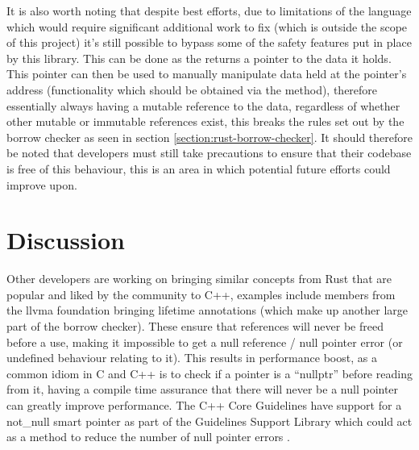 \documentclass[a4paper]{article}
\begin{document}
It is also worth noting that despite best efforts, due to limitations of the language which would require significant additional work to fix (which is outside the scope of this project) it's still possible to bypass some of the safety features put in place by this library. This can be done as the  returns a pointer to the data it holds. This pointer can then be used to manually manipulate data held at the pointer's address (functionality which should be obtained via the  method), therefore essentially always having a mutable reference to the data, regardless of whether other mutable or immutable references exist, this breaks the rules set out by the borrow checker as seen in section \ref{section:rust-borrow-checker}. It should therefore be noted that developers must still take precautions to ensure that their codebase is free of this behaviour, this is an area in which potential future efforts could improve upon.

\section{Discussion}
Other developers are working on bringing similar concepts from Rust that are popular and liked by the community to C++, examples include members from the \gls{llvma} foundation bringing lifetime annotations \parencite{lifetime-annotations-cpp} (which make up another large part of the borrow checker). These ensure that references will never be freed before a use, making it impossible to get a null reference / null pointer error (or undefined behaviour relating to it). This results in performance boost, as a common idiom in C and C++ is to check if a pointer is a ``nullptr'' before reading from it, having a compile time assurance that there will never be a null pointer can greatly improve performance. The C++ Core Guidelines have support for a not\_null smart pointer as part of the Guidelines Support Library which could act as a method to reduce the number of null pointer errors \parencite{cpp-guidelines-notnull}.
\end{document}
